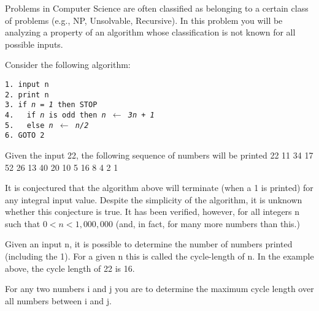 Problems in Computer Science are often classified as belonging to a certain class of problems (e.g., NP, Unsolvable, Recursive). In this problem you will be analyzing a property of an algorithm whose classification is not known for all possible inputs.

Consider the following algorithm:

\texttt{1. input n\\
2. print n\\
3. if {\it n = 1} then STOP\\
4. \, if {\it n} is odd then {\it n $\leftarrow$ 3n + 1}\\
5. \, else {\it n $\leftarrow$ n/2}\\
6. GOTO 2\\
}

Given the input 22, the following sequence of numbers will be printed 22 11 34 17 52 26 13 40 20 10 5 16 8 4 2 1

It is conjectured that the algorithm above will terminate (when a 1 is printed) for any integral input value. Despite the simplicity of the algorithm, it is unknown whether this conjecture is true. It has been verified, however, for all integers n such that $0 < n < 1,000,000$ (and, in fact, for many more numbers than this.)

Given an input n, it is possible to determine the number of numbers printed (including the 1). For a given n this is called the cycle-length of n. In the example above, the cycle length of 22 is 16.

For any two numbers i and j you are to determine the maximum cycle length over all numbers between i and j.